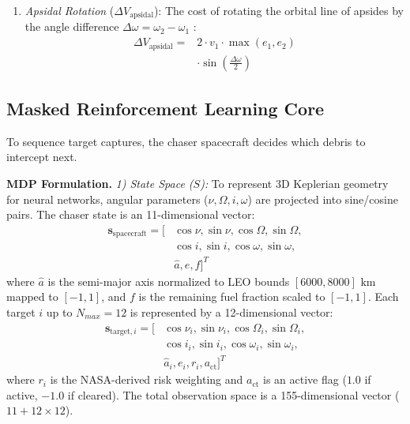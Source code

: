 \documentclass[10pt,conference,a4paper]{IEEEtran}
\begin{document}
\begin{enumerate}
\item \textit{Apsidal Rotation} ($\Delta V_{\text{apsidal}}$): The cost of rotating the orbital line of apsides by the angle difference $\Delta\omega = \omega_2 - \omega_1$ \cite{vallado}:
\begin{equation}
\begin{aligned}
\Delta V_{\text{apsidal}} = &2 \cdot v_1 \cdot \max(e_1, e_2) \\
&\cdot \sin\left(\frac{\Delta\omega}{2}\right)
\end{aligned}
\end{equation}
\end{enumerate}

\subsection{Masked Reinforcement Learning Core}
To sequence target captures, the chaser spacecraft decides which debris to intercept next.

\textbf{MDP Formulation.} \textit{1) State Space ($S$):} To represent 3D Keplerian geometry for neural networks, angular parameters ($\nu, \Omega, i, \omega$) are projected into sine/cosine pairs. The chaser state is an 11-dimensional vector:
\begin{equation}
\begin{aligned}
\mathbf{s}_{\text{spacecraft}} = [ &\cos\nu, \sin\nu, \cos\Omega, \sin\Omega, \\
                                   &\cos i, \sin i, \cos\omega, \sin\omega, \\
                                   &\hat{a}, e, f ]^T
\end{aligned}
\end{equation}
where $\hat{a}$ is the semi-major axis normalized to LEO bounds $[6000, 8000]\text{ km}$ mapped to $[-1, 1]$, and $f$ is the remaining fuel fraction scaled to $[-1, 1]$.
Each target $i$ up to $N_{max} = 12$ is represented by a 12-dimensional vector:
\begin{equation}
\begin{aligned}
\mathbf{s}_{\text{target}, i} = [ &\cos\nu_i, \sin\nu_i, \cos\Omega_i, \sin\Omega_i, \\
                                  &\cos i_i, \sin i_i, \cos\omega_i, \sin\omega_i, \\
                                  &\hat{a}_i, e_i, r_i, a_{\text{ct}} ]^T
\end{aligned}
\end{equation}
where $r_i$ is the NASA-derived risk weighting and $a_{\text{ct}}$ is an active flag ($1.0$ if active, $-1.0$ if cleared). The total observation space is a 155-dimensional vector ($11 + 12 \times 12$).
\end{document}
